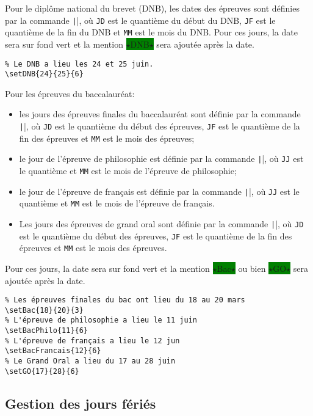 \documentclass[a4paper,french,10pt]{article}
\begin{document}
Pour le diplôme national du brevet (DNB), les dates des épreuves sont définies
par la commande \texttt||, où \texttt{JD} est le
quantième du début du DNB, \texttt{JF} est le quantième de la fin du DNB et
\texttt{MM} est le mois du DNB. Pour ces jours, la date sera sur fond vert et la
mention \colorbox{green}{$\star$DNB$\star$} sera ajoutée après la date.
\begin{verbatim}
% Le DNB a lieu les 24 et 25 juin.
\setDNB{24}{25}{6}
\end{verbatim}
Pour les épreuves du baccalauréat:
\begin{itemize}
  \item les jours des épreuves finales du baccalauréat sont définie par la
    commande \texttt||, où \texttt{JD} est le
    quantième du début des épreuves, \texttt{JF} est le quantième de la fin des
    épreuves et \texttt{MM} est le mois des épreuves;
  \item le jour de l'épreuve de philosophie est définie par la commande
    \texttt||, où \texttt{JJ} est le quantième et
    \texttt{MM} est le mois de l'épreuve de philosophie;
  \item le jour de l'épreuve de français est définie par la commande
    \texttt||, où \texttt{JJ} est le quantième
    et \texttt{MM} est le mois de l'épreuve de français.
  \item Les jours des épreuves de grand oral sont définie par la commande
    \texttt||, où \texttt{JD} est le quantième du
    début des épreuves, \texttt{JF} est le quantième de la fin des épreuves et
    \texttt{MM} est le mois des épreuves.
\end{itemize}
Pour ces jours, la date sera sur fond vert et la mention
\colorbox{green}{$\star$Bac$\star$} ou bien \colorbox{green}{$\star$GO$\star$}
sera ajoutée après la date.
\begin{verbatim}
% Les épreuves finales du bac ont lieu du 18 au 20 mars
\setBac{18}{20}{3}
% L'épreuve de philosophie a lieu le 11 juin
\setBacPhilo{11}{6}
% L'épreuve de français a lieu le 12 jun
\setBacFrancais{12}{6}
% Le Grand Oral a lieu du 17 au 28 juin
\setGO{17}{28}{6}
\end{verbatim}



\subsection{Gestion des jours fériés}
\end{document}
